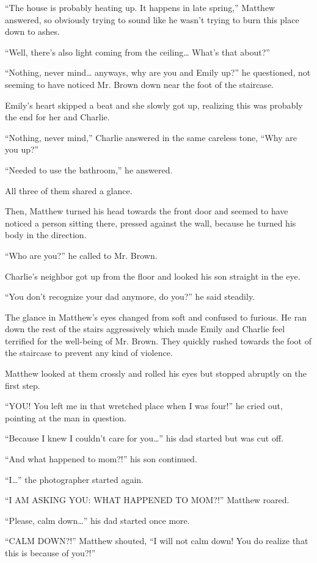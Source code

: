“The house is probably heating up. It happens in late spring,” Matthew answered, so obviously trying to sound like he wasn't trying to burn this place down to ashes.

“Well, there's also light coming from the ceiling… What's that about?”

“Nothing, never mind… anyways, why are you and Emily up?” he questioned, not seeming to have noticed Mr. Brown down near the foot of the staircase.

Emily's heart skipped a beat and she slowly got up, realizing this was probably the end for her and Charlie.

“Nothing, never mind,” Charlie answered in the same careless tone, “Why are you up?”

“Needed to use the bathroom,” he answered.

All three of them shared a glance.

Then, Matthew turned his head towards the front door and seemed to have noticed a person sitting there, pressed against the wall, because he turned his body in the direction.

“Who are you?” he called to Mr. Brown.

Charlie's neighbor got up from the floor and looked his son straight in the eye.

“You don't recognize your dad anymore, do you?” he said steadily.

The glance in Matthew's eyes changed from soft and confused to furious. He ran down the rest of the stairs aggressively which made Emily and Charlie feel terrified for the well-being of Mr. Brown. They quickly rushed towards the foot of the staircase to prevent any kind of violence.

Matthew looked at them crossly and rolled his eyes but stopped abruptly on the first step.

“YOU! You left me in that wretched place when I was four!” he cried out, pointing at the man in question.

“Because I knew I couldn't care for you…” his dad started but was cut off.

“And what happened to mom?!” his son continued.

“I…” the photographer started again.

“I AM ASKING YOU: WHAT HAPPENED TO MOM?!” Matthew roared.

“Please, calm down…” his dad started once more.

“CALM DOWN?!” Matthew shouted, “I will not calm down! You do realize that this is because of you?!”

